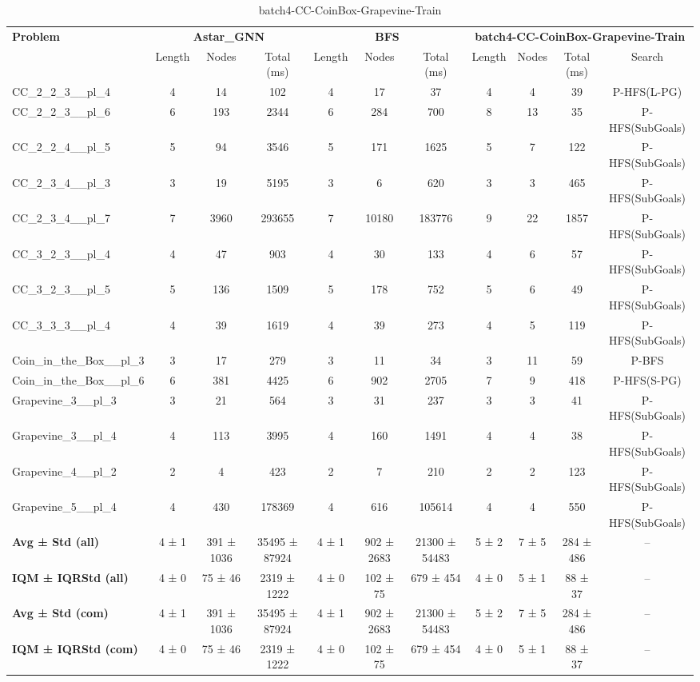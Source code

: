 \begin{table}[!ht]
\centering
\scriptsize
\begin{tabular}{l|ccc|ccc|cccc}
\multirow{2}{*}{\textbf{Problem}} & \multicolumn{3}{c|}{\textbf{Astar\_GNN}} & \multicolumn{3}{c|}{\textbf{BFS}} & \multicolumn{4}{c}{\textbf{batch4-CC-CoinBox-Grapevine-Train}} \\
\cline{2-11}
& Length & Nodes & Total (ms) & Length & Nodes & Total (ms) & Length & Nodes & Total (ms) & Search \\
\hline
CC\_2\_2\_3\_\_pl\_4 & 4 & 14 & 102 & 4 & 17 & 37 & 4 & 4 & 39 & P-HFS(L-PG) \\
CC\_2\_2\_3\_\_pl\_6 & 6 & 193 & 2344 & 6 & 284 & 700 & 8 & 13 & 35 & P-HFS(SubGoals) \\
CC\_2\_2\_4\_\_pl\_5 & 5 & 94 & 3546 & 5 & 171 & 1625 & 5 & 7 & 122 & P-HFS(SubGoals) \\
CC\_2\_3\_4\_\_pl\_3 & 3 & 19 & 5195 & 3 & 6 & 620 & 3 & 3 & 465 & P-HFS(SubGoals) \\
CC\_2\_3\_4\_\_pl\_7 & 7 & 3960 & 293655 & 7 & 10180 & 183776 & 9 & 22 & 1857 & P-HFS(SubGoals) \\
CC\_3\_2\_3\_\_pl\_4 & 4 & 47 & 903 & 4 & 30 & 133 & 4 & 6 & 57 & P-HFS(SubGoals) \\
CC\_3\_2\_3\_\_pl\_5 & 5 & 136 & 1509 & 5 & 178 & 752 & 5 & 6 & 49 & P-HFS(SubGoals) \\
CC\_3\_3\_3\_\_pl\_4 & 4 & 39 & 1619 & 4 & 39 & 273 & 4 & 5 & 119 & P-HFS(SubGoals) \\
Coin\_in\_the\_Box\_\_pl\_3 & 3 & 17 & 279 & 3 & 11 & 34 & 3 & 11 & 59 & P-BFS \\
Coin\_in\_the\_Box\_\_pl\_6 & 6 & 381 & 4425 & 6 & 902 & 2705 & 7 & 9 & 418 & P-HFS(S-PG) \\
Grapevine\_3\_\_pl\_3 & 3 & 21 & 564 & 3 & 31 & 237 & 3 & 3 & 41 & P-HFS(SubGoals) \\
Grapevine\_3\_\_pl\_4 & 4 & 113 & 3995 & 4 & 160 & 1491 & 4 & 4 & 38 & P-HFS(SubGoals) \\
Grapevine\_4\_\_pl\_2 & 2 & 4 & 423 & 2 & 7 & 210 & 2 & 2 & 123 & P-HFS(SubGoals) \\
Grapevine\_5\_\_pl\_4 & 4 & 430 & 178369 & 4 & 616 & 105614 & 4 & 4 & 550 & P-HFS(SubGoals) \\
\hline
\textbf{Avg ± Std (all)} & 4 ± 1 & 391 ± 1036 & 35495 ± 87924 & 4 ± 1 & 902 ± 2683 & 21300 ± 54483 & 5 ± 2 & 7 ± 5 & 284 ± 486 & -- \\
\textbf{IQM ± IQRStd (all)} & 4 ± 0 & 75 ± 46 & 2319 ± 1222 & 4 ± 0 & 102 ± 75 & 679 ± 454 & 4 ± 0 & 5 ± 1 & 88 ± 37 & -- \\
\textbf{Avg ± Std (com)} & 4 ± 1 & 391 ± 1036 & 35495 ± 87924 & 4 ± 1 & 902 ± 2683 & 21300 ± 54483 & 5 ± 2 & 7 ± 5 & 284 ± 486 & -- \\
\textbf{IQM ± IQRStd (com)} & 4 ± 0 & 75 ± 46 & 2319 ± 1222 & 4 ± 0 & 102 ± 75 & 679 ± 454 & 4 ± 0 & 5 ± 1 & 88 ± 37 & -- \\
\end{tabular}
\caption{batch4-CC-CoinBox-Grapevine-Train}
\label{tab:batch4_CC-CoinBox-Grapevine_comparison_train}
\end{table}
